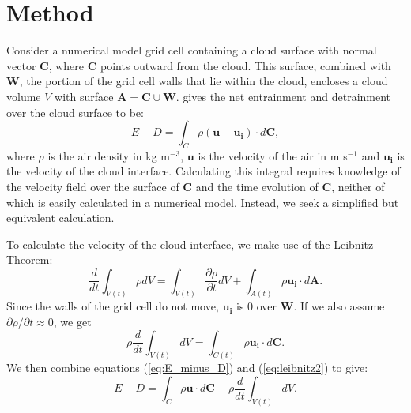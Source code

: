 \documentclass[12pt]{article}
\begin{document}

\section{Method}

Consider a numerical model grid cell containing a cloud surface with normal 
vector $\mathbf{C}$, where $\mathbf{C}$ points outward from the cloud.  This 
surface, combined with $\mathbf{W}$, the portion of the grid cell walls that 
lie within the cloud, encloses a cloud volume $V$ with surface $\mathbf{A}
= \mathbf{C} \cup \mathbf{W}$.  \cite{Siebesma1998} gives the net entrainment 
and detrainment over the cloud surface to be:
\begin{equation}
\label{eq:E_minus_D} 
E - D = \int_C \rho ( \mathbf{u} -  \mathbf{u_i}) \cdot d\mathbf{C},
\end{equation}
where $\rho$ is the air density in kg m$^{-3}$, $\mathbf{u}$ is the velocity
of the air in m s$^{-1}$ and $\mathbf{u_i}$ is the velocity of the cloud 
interface.  Calculating this integral requires knowledge of the velocity field
over the surface of $\mathbf{C}$ and the time evolution of $\mathbf{C}$, 
neither of which is easily calculated in a numerical model.  Instead, we seek a
simplified but equivalent calculation.

To calculate the velocity of the cloud interface, we make use of the Leibnitz 
Theorem:
\begin{equation}
\label{eq:leibnitz} 
\frac{d}{dt}\int_{V(t)} \rho dV = 
  \int_{V(t)} \frac{\partial \rho}{ \partial t} dV 
  + \int_{A(t)} \rho \mathbf{u_i}\cdot d\mathbf{A}.
\end{equation}
Since the walls of the grid cell do not move, $\mathbf{u_i}$ is 0 over 
$\mathbf{W}$.  If we also assume ${\partial \rho}/{ \partial t} \approx 0$, we
get
\begin{equation}
\label{eq:leibnitz2} 
    \rho \frac{d}{dt}\int_{V(t)} dV = 
    \int_{C(t)} \rho \mathbf{u_i}\cdot d\mathbf{C}.
\end{equation}
We then combine equations (\ref{eq:E_minus_D}) and (\ref{eq:leibnitz2}) to give:
\begin{equation}
\label{eq:step1} 
      E - D = \int_C \rho \mathbf{u} \cdot d\mathbf{C} 
            - \rho \frac{d}{dt}\int_{V(t)} dV.
\end{equation}
\end{document}
